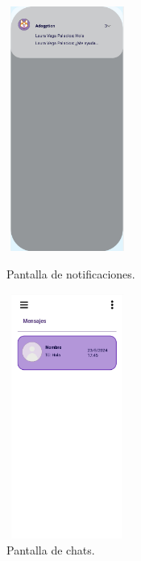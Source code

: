 \documentclass[a4paper, 12pt]{article}
\begin{document}
\begin{figure}[H]
   	\begin{minipage}{0.48\textwidth}
		\begin{center}
			{\includegraphics[height=8cm, width=4cm]{design/Notification.jpg}\par}
			\caption{Pantalla de notificaciones.}
			\medskip
		\end{center}  
	\end{minipage}\hfill
   	\begin{minipage}{0.48\textwidth}
		\begin{center}
			{\includegraphics[height=8cm, width=4cm]{design/Messages.jpg}\par}
			\caption{Pantalla de chats.}
			\medskip
		\end{center}  
	\end{minipage}\hfill
\end{figure}
\end{document}
